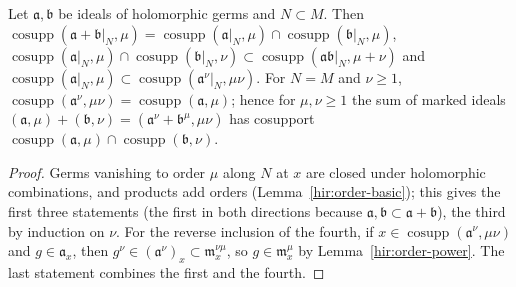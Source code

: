 \begin{lemma}
\label{hir:marked-ideal-operations}
\mixedleanok
Let \(\mathfrak a,\mathfrak b\) be ideals of holomorphic germs and \(N\subset M\). Then
\(\operatorname{cosupp}(\mathfrak a+\mathfrak b|_N,\mu)=\operatorname{cosupp}(\mathfrak a|_N,\mu)\cap\operatorname{cosupp}(\mathfrak b|_N,\mu)\),
\(\operatorname{cosupp}(\mathfrak a|_N,\mu)\cap\operatorname{cosupp}(\mathfrak b|_N,\nu)\subset\operatorname{cosupp}(\mathfrak a\mathfrak b|_N,\mu+\nu)\) and
\(\operatorname{cosupp}(\mathfrak a|_N,\mu)\subset\operatorname{cosupp}(\mathfrak a^\nu|_N,\mu\nu)\). For \(N=M\) and \(\nu\ge1\),
\(\operatorname{cosupp}(\mathfrak a^\nu,\mu\nu)=\operatorname{cosupp}(\mathfrak a,\mu)\); hence for \(\mu,\nu\ge1\) the sum of marked ideals
\((\mathfrak a,\mu)+(\mathfrak b,\nu)=(\mathfrak a^\nu+\mathfrak b^\mu,\mu\nu)\) has cosupport
\(\operatorname{cosupp}(\mathfrak a,\mu)\cap\operatorname{cosupp}(\mathfrak b,\nu)\).
\end{lemma}
\begin{proof}
\mixedleanok
Germs vanishing to order \(\mu\) along \(N\) at \(x\) are closed under holomorphic combinations, and products add orders
(Lemma~\ref{hir:order-basic}); this gives the first three statements (the first in both directions because
\(\mathfrak a,\mathfrak b\subset\mathfrak a+\mathfrak b\)), the third by induction on \(\nu\). For the reverse inclusion of the fourth, if
\(x\in\operatorname{cosupp}(\mathfrak a^\nu,\mu\nu)\) and \(g\in\mathfrak a_x\), then \(g^\nu\in(\mathfrak a^\nu)_x\subset\mathfrak m_x^{\nu\mu}\), so \(g\in\mathfrak m_x^\mu\) by
Lemma~\ref{hir:order-power}. The last statement combines the first and the fourth.
\end{proof}

